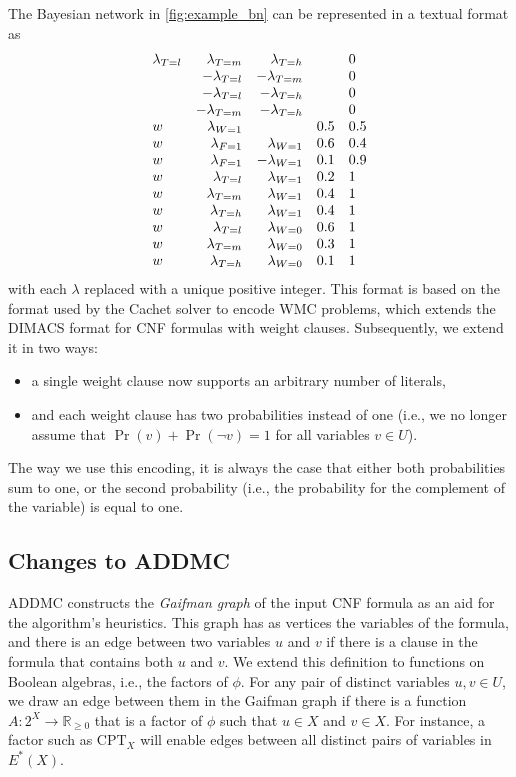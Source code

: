 \documentclass{article}
\theoremstyle{definition}
\theoremstyle{remark}
\begin{document}
The Bayesian network in \cref{fig:example_bn} can be represented in a textual
format as
\[
  \begin{array}{l r r l l}
    \lambda\sb{T=l} &\lambda\sb{T=m} &\lambda\sb{T=h} & &0 \\
                    &-\lambda\sb{T=l} &-\lambda\sb{T=m} & &0 \\
                    &-\lambda\sb{T=l} &-\lambda\sb{T=h} & &0 \\
                    &-\lambda\sb{T=m} &-\lambda\sb{T=h} & &0 \\
    w &\lambda\sb{W=1} & &0.5 &0.5 \\
    w &\lambda\sb{F=1} &\lambda\sb{W=1} &0.6 &0.4 \\
    w &\lambda\sb{F=1} &-\lambda\sb{W=1} &0.1 &0.9 \\
    w &\lambda\sb{T=l} &\lambda\sb{W=1} &0.2 &1 \\
    w &\lambda\sb{T=m} &\lambda\sb{W=1} &0.4 &1 \\
    w &\lambda\sb{T=h} &\lambda\sb{W=1} &0.4 &1 \\
    w &\lambda\sb{T=l} &\lambda\sb{W=0} &0.6 &1 \\
    w &\lambda\sb{T=m} &\lambda\sb{W=0} &0.3 &1 \\
    w &\lambda\sb{T=h} &\lambda\sb{W=0} &0.1 &1
  \end{array}
\]
with each $\lambda$ replaced with a unique positive integer. This format is
based on the format used by the Cachet solver \cite{DBLP:conf/sat/SangBBKP04}
to encode WMC problems, which extends the DIMACS format for CNF formulas with
weight clauses. Subsequently, we extend it in two ways:
\begin{itemize}
\item a single weight clause now supports an arbitrary number of literals,
\item and each weight clause has two probabilities instead of one (i.e., we no
  longer assume that $\Pr(v) + \Pr(\neg v) = 1$ for all variables $v \in U$).
\end{itemize}
The way we use this encoding, it is always the case that either both
probabilities sum to one, or the second probability (i.e., the probability for
the complement of the variable) is equal to one.

\subsection{Changes to ADDMC}

ADDMC constructs the \emph{Gaifman graph} \cite{gaifman1982local} of the input
CNF formula as an aid for the algorithm's heuristics. This graph has as vertices
the variables of the formula, and there is an edge between two variables $u$ and
$v$ if there is a clause in the formula that contains both $u$ and $v$. We
extend this definition to functions on Boolean algebras, i.e., the factors of
$\phi$. For any pair of distinct variables $u, v \in U$, we draw an edge between
them in the Gaifman graph if there is a function $A\colon 2^X \to
\mathbb{R}_{\ge 0}$ that is a factor of $\phi$ such that $u \in X$ and $v \in
X$. For instance, a factor such as $\mathrm{CPT}_X$ will enable edges between
all distinct pairs of variables in $E^*(X)$.
\end{document}
